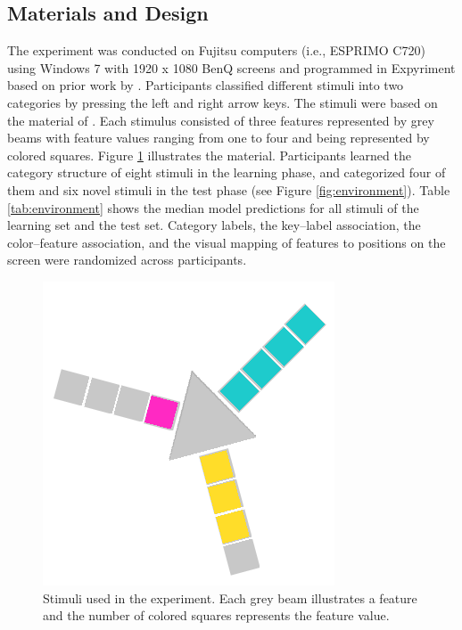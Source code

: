 \documentclass[a4paper,man,natbib]{apa6}
\begin{document}
\subsection{Materials and Design}
The experiment was conducted on Fujitsu computers (i.e., ESPRIMO C720) using Windows 7 with 1920 x 1080 BenQ screens and programmed in Expyriment \citep{krause2014expyriment} based on prior work by \cite{albrechtxxxunstacking}. Participants classified different stimuli into two categories by pressing the left and right arrow keys. The stimuli were based on the material of \cite{albrechtxxxunstacking}. Each stimulus consisted of three features represented by grey beams with feature values ranging from one to four and being represented by colored squares. Figure \ref{fig:material} illustrates the material. Participants learned the category structure of eight stimuli in the learning phase, and categorized four of them and six novel stimuli in the test phase (see Figure \ref{fig:environment}). Table \ref{tab:environment} shows the median model predictions for all stimuli of the learning set and the test set. Category labels, the key--label association, the color--feature association, and the visual mapping of features to positions on the screen were randomized across participants.

\begin{figure}
\centering
\includegraphics{fig_material.PNG}
\caption{Stimuli used in the experiment. Each grey beam illustrates a feature and the number of colored squares represents the feature value.}
\label{fig:material}
\end{figure}
\end{document}

